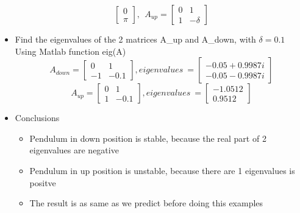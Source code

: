 \documentclass{article}
\begin{document}
\begin{itemize}
\begin{equation}
\begin{bmatrix}
        0\\ \pi  
      \end{bmatrix}
      ,~~A_{up} =  
      \begin{bmatrix}
        0 &  1 \\ 
       1 & -\delta
     \end{bmatrix}  
    \end{equation}
  \item Find the eigenvalues of the 2 matrices A\_up and A\_down, with $\delta = 0.1$
  \\Using Matlab function eig(A)
  \begin{equation}
    A_{down} =  
    \begin{bmatrix}
      0 &  1 \\ 
     -1 & -0.1
   \end{bmatrix}
   , eigenvalues~ = 
    \begin{bmatrix}
      -0.05 + 0.9987i \\ 
      -0.05 - 0.9987i
    \end{bmatrix}  
  \end{equation}
  \begin{equation}
    A_{up} =  
    \begin{bmatrix}
      0 &  1 \\ 
      1 & -0.1
   \end{bmatrix}
   , eigenvalues~ = 
    \begin{bmatrix}
      -1.0512 \\ 
      0.9512
    \end{bmatrix}  
  \end{equation}
  \item Conclusions
    \begin{itemize}
      \item Pendulum in down position is stable, because the real part of 2 eigenvalues are negative
      \item Pendulum in up position is unstable, because there are 1 eigenvalues is positve
      \item The result is as same as we predict before doing this examples
    \end{itemize}
\end{itemize}
\end{document}
